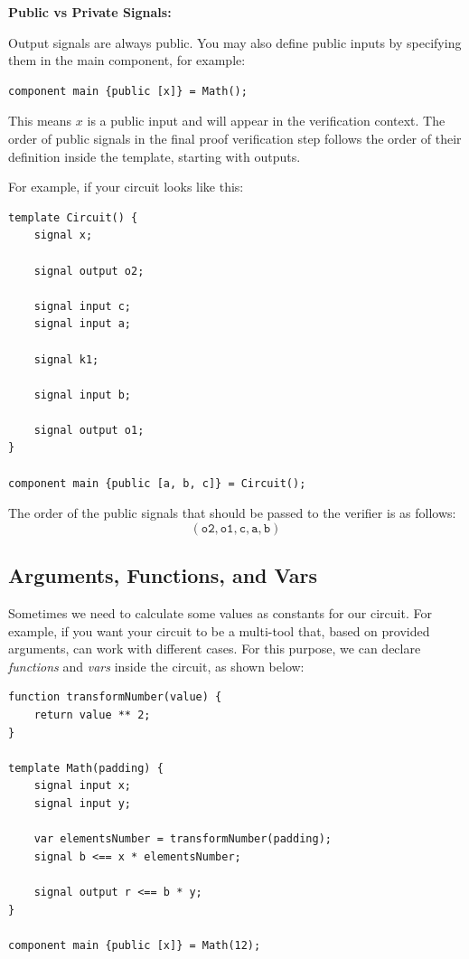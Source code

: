 \documentclass[../lecture-notes.tex]{subfiles}
\begin{document}
    \vspace{0.5cm}

    \textbf{Public vs Private Signals:}

    Output signals are always public.
    You may also define public inputs by specifying them in the main component, for example:

    \begin{lstlisting}[language=Circom,numbers=none]
component main {public [x]} = Math();
    \end{lstlisting}

    This means $x$ is a public input and will appear in the verification context.
    The order of public signals in the final proof verification step follows the order of their definition inside the template, starting with outputs.

    \newpage

    For example, if your circuit looks like this:
    \begin{lstlisting}[language=Circom,numbers=none]
template Circuit() {
    signal x;

    signal output o2;

    signal input c;
    signal input a;

    signal k1;

    signal input b;

    signal output o1;
}

component main {public [a, b, c]} = Circuit();
    \end{lstlisting}

    The order of the public signals that should be passed to the verifier is as follows:
    \[ (\texttt{o2}, \texttt{o1}, \texttt{c}, \texttt{a}, \texttt{b}) \]

    \subsection{Arguments, Functions, and Vars}

    Sometimes we need to calculate some values as constants for our circuit.
    For example, if you want your circuit to be a multi-tool that, based on provided arguments, can work with different cases.
    For this purpose, we can declare \textit{functions} and \textit{vars} inside the circuit, as shown below:

    \begin{lstlisting}[language=Circom,numbers=none]
function transformNumber(value) {
    return value ** 2;
}

template Math(padding) {
    signal input x;
    signal input y;

    var elementsNumber = transformNumber(padding);
    signal b <== x * elementsNumber;

    signal output r <== b * y;
}

component main {public [x]} = Math(12);
    \end{lstlisting}
\end{document}
